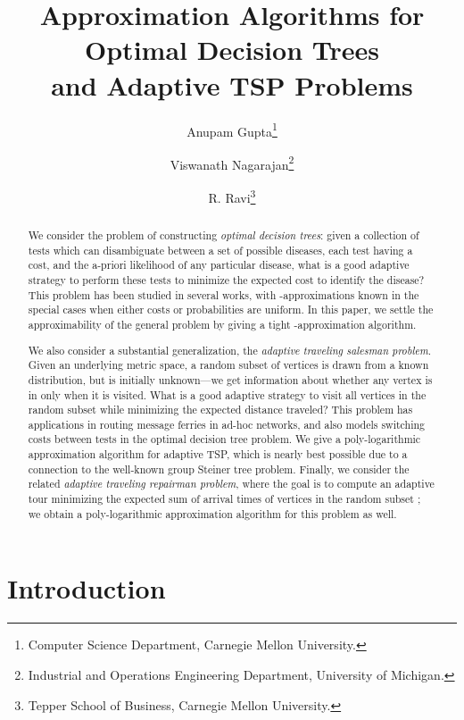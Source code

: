 \documentclass[11pt]{article}
\title{Approximation Algorithms for Optimal Decision Trees  \\ and Adaptive
  TSP Problems}
\author{
Anupam Gupta\thanks{Computer Science Department, Carnegie Mellon
    University.}  \and Viswanath Nagarajan\thanks{ Industrial and Operations Engineering Department, University of Michigan.} \and  R. Ravi\thanks{Tepper School of Business, Carnegie Mellon University.}}
\date{}
\begin{document}
\maketitle
\begin{abstract}
We consider the problem of constructing {\em optimal decision trees}: 
  given a collection of tests which can disambiguate between a set of
   possible diseases, each test having a cost, and the a-priori
  likelihood of any particular disease, what is a
  good adaptive strategy to perform these tests to minimize the expected
  cost to identify the disease?
This problem has been studied in several works, with -approximations known in the special cases when either
costs or probabilities are uniform. In this paper, we settle the approximability of the general problem by giving a tight -approximation
algorithm.

We also consider a substantial generalization, the
{\em adaptive traveling salesman problem}. Given an underlying metric space, a random subset  of vertices is drawn
from a known distribution, but  is initially unknown---we get information about whether any vertex is in 
only when it is visited. What is a good adaptive strategy to visit all vertices in the random subset  while
minimizing the expected distance traveled? This problem has applications in routing message ferries in ad-hoc networks,
and also models switching costs between tests in the optimal decision tree problem. We give a poly-logarithmic
approximation algorithm for adaptive TSP, which is nearly best possible due to a connection to the well-known group Steiner tree problem. Finally, we consider the related {\em adaptive traveling repairman
problem}, where the goal is to compute an adaptive tour minimizing the expected sum of arrival times of vertices in the random subset ; we obtain a poly-logarithmic approximation algorithm for this problem as well.
\end{abstract}





\section{Introduction}
\end{document}
